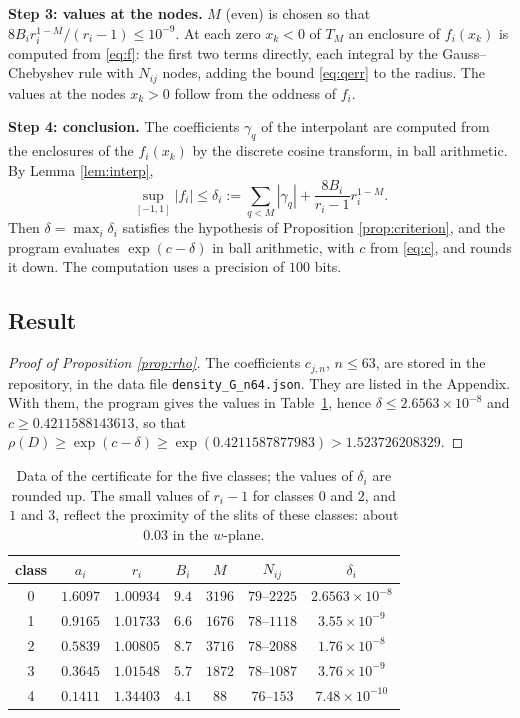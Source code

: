 \documentclass[11pt]{amsart}
\theoremstyle{remark}
\begin{document}
\smallskip\noindent\textbf{Step 3: values at the nodes.}
$M$ (even) is chosen so that $8B_ir_i^{1-M}/(r_i-1)\le10^{-9}$. At each zero $x_k<0$ of $T_M$ an enclosure of
$f_i(x_k)$ is computed from \eqref{eq:f}: the first two terms directly, each integral by the Gauss--Chebyshev rule
with $N_{ij}$ nodes, adding the bound \eqref{eq:qerr} to the radius. The values at the nodes $x_k>0$ follow from
the oddness of $f_i$.

\smallskip\noindent\textbf{Step 4: conclusion.}
The coefficients $\gamma_q$ of the interpolant are computed from the enclosures of the $f_i(x_k)$ by the discrete
cosine transform, in ball arithmetic. By Lemma \ref{lem:interp},
\[
\sup_{[-1,1]}|f_i|\le\delta_i:=\sum_{q<M}|\gamma_q|+\frac{8B_i}{r_i-1}r_i^{1-M}.
\]
Then $\delta=\max_i\delta_i$ satisfies the hypothesis of Proposition \ref{prop:criterion}, and the program
evaluates $\exp(c-\delta)$ in ball arithmetic, with $c$ from \eqref{eq:c}, and rounds it down. The computation
uses a precision of $100$ bits.

\subsection{Result}

\begin{proof}[Proof of Proposition \ref{prop:rho}]
\sloppy
The coefficients $c_{j,n}$, $n\le63$, are stored in the repository, in the data file \texttt{density\_G\_n64.json}.
They are listed in the Appendix. With them, the program gives the values in Table~\ref{tab:cert}, hence
$\delta\le2.6563\times10^{-8}$ and $c\ge0.4211588143613$, so that
$\rho(D)\ge\exp(c-\delta)\ge\exp(0.4211587877983)>1.523726208329$.
\end{proof}

\begin{table}[h]
\centering\small
\begin{tabular}{ccccccc}
\toprule
class & $a_i$ & $r_i$ & $B_i$ & $M$ & $N_{ij}$ & $\delta_i$\\
\midrule
0 & $1.6097$ & $1.00934$ & $9.4$ & $3196$ & $79$--$2225$ & $2.6563\times10^{-8}$\\
1 & $0.9165$ & $1.01733$ & $6.6$ & $1676$ & $78$--$1118$ & $3.55\times10^{-9}$\\
2 & $0.5839$ & $1.00805$ & $8.7$ & $3716$ & $78$--$2088$ & $1.76\times10^{-8}$\\
3 & $0.3645$ & $1.01548$ & $5.7$ & $1872$ & $78$--$1087$ & $3.76\times10^{-9}$\\
4 & $0.1411$ & $1.34403$ & $4.1$ & $88$ & $76$--$153$ & $7.48\times10^{-10}$\\
\bottomrule
\end{tabular}
\caption{Data of the certificate for the five classes; the values of $\delta_i$ are rounded up. The small values
of $r_i-1$ for classes $0$ and $2$,
and $1$ and $3$, reflect the proximity of the slits of these classes: about $0.03$ in the $w$-plane.}\label{tab:cert}
\end{table}
\end{document}

